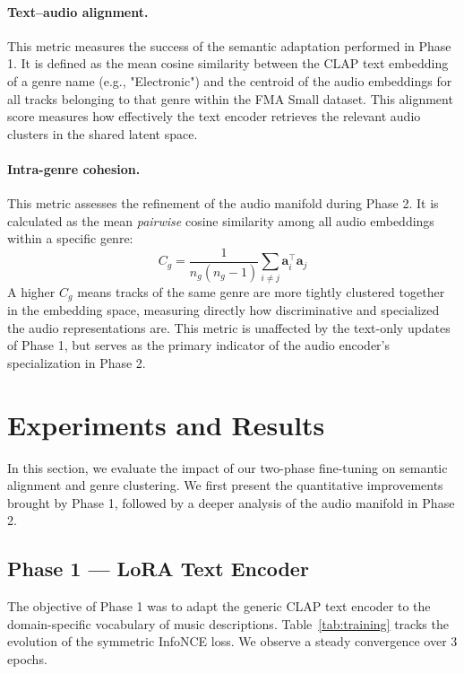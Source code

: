 \documentclass[11pt]{article}
\begin{document}
\paragraph{Text--audio alignment.} This metric measures the success of the semantic adaptation performed in Phase 1. It is defined as the mean cosine similarity between the CLAP text embedding of a genre name (e.g., "Electronic") and the centroid of the audio embeddings for all tracks belonging to that genre within the FMA Small dataset. This alignment score measures how effectively the text encoder retrieves the relevant audio clusters in the shared latent space.

\paragraph{Intra-genre cohesion.} This metric assesses the refinement of the audio manifold during Phase 2. It is calculated as the mean \emph{pairwise} cosine similarity among all audio embeddings within a specific genre:
\[
    C_g = \frac{1}{n_g(n_g-1)}\sum_{i \neq j} \mathbf{a}_i^\top \mathbf{a}_j
\]
A higher $C_g$ means tracks of the same genre are more tightly clustered together in the embedding space, measuring directly how discriminative and specialized the audio representations are.
This metric is unaffected by the text-only updates of Phase 1, but serves as the primary indicator of the audio encoder’s specialization in Phase 2.



\section{Experiments and Results}

In this section, we evaluate the impact of our two-phase fine-tuning on semantic alignment and genre clustering. We first present the quantitative improvements brought by Phase 1, followed by a deeper analysis of the audio manifold in Phase 2.

\subsection{Phase 1 — LoRA Text Encoder}
The objective of Phase 1 was to adapt the generic CLAP text encoder to the domain-specific vocabulary of music descriptions. Table~\ref{tab:training} tracks the evolution of the symmetric InfoNCE loss. We observe a steady convergence over 3 epochs.
\end{document}
